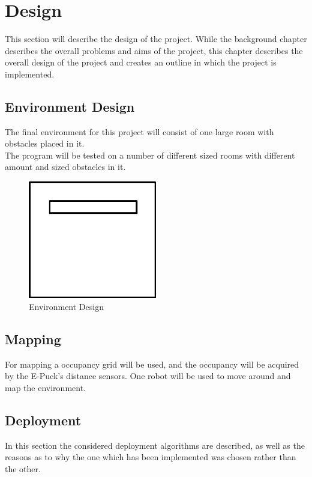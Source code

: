 

\chapter{Design}
\label{Design}

This section will describe the design of the project.
While the background chapter describes the overall problems and aims of the project, this chapter describes the overall design of the project and creates an outline in which the project is implemented.

\section{Environment Design}
The final environment for this project will consist of one large room with obstacles placed in it. \\
The program will be tested on a number of different sized rooms with different amount and sized obstacles in it.

\begin{figure}[h]
\centering
\includegraphics[width=0.5\textwidth]{../../figures/environment_example2.png} 
\caption{Environment Design}
\label{Figure 2}
\end{figure}

\section{Mapping}
For mapping a occupancy grid will be used, and the occupancy will be acquired by the E-Puck's distance sensors. 
One robot will be used to move around and map the environment. 

\section{Deployment}
\label{deployment_design}
In this section the considered deployment algorithms are described, as well as the reasons as to why the one which has been implemented was chosen rather than the other. 

